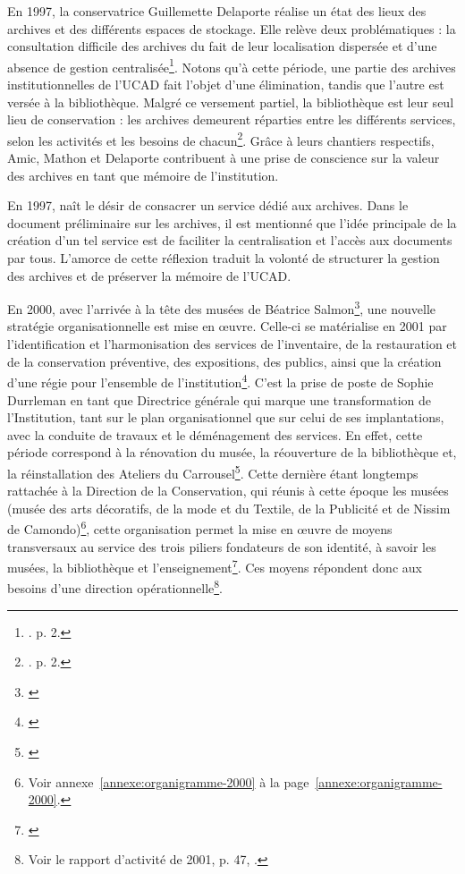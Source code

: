 En 1997, la conservatrice Guillemette Delaporte réalise un état des lieux des archives et des différents espaces de stockage. Elle relève deux problématiques : la  consultation difficile des archives du fait de leur localisation dispersée et d’une absence de gestion centralisée\footnote{\cite{delaporte-1997}. p. 2.}.  Notons qu'à cette période, une partie des archives institutionnelles de l’UCAD fait l’objet d’une élimination, tandis que l’autre est versée à la bibliothèque. Malgré ce versement partiel, la bibliothèque est leur seul lieu de conservation : les archives demeurent réparties entre les différents services, selon les activités et les besoins de chacun\footnote{\cite{delaporte-1997}. p. 2.}. Grâce à leurs chantiers respectifs, Amic, Mathon et Delaporte contribuent à une prise de conscience sur la valeur des archives en tant que mémoire de l'institution.

En 1997, naît le désir de consacrer un service dédié aux archives. Dans le document préliminaire sur les archives, il est mentionné que l’idée principale de la création d’un tel service est de faciliter la centralisation et l’accès aux documents par tous. L'amorce de cette réflexion traduit la volonté de structurer la gestion des archives et de préserver la mémoire de l’UCAD.


En 2000, avec l’arrivée à la tête des musées de Béatrice Salmon\footnote{\cite{mad-depuis-1864}}, une nouvelle stratégie organisationnelle est mise en œuvre. Celle-ci se matérialise en 2001 par l’identification et l'harmonisation des services de l’inventaire, de la restauration et de la conservation préventive, des expositions, des publics, ainsi que la création d’une régie pour l’ensemble de l’institution\footnote{\cite{dion-histoire-bad-2026}}. C'est la prise de poste de Sophie Durrleman en tant que Directrice générale qui marque une transformation de l’Institution, tant sur le plan organisationnel que sur celui de ses implantations, avec la conduite de travaux et le déménagement des services. En effet, cette période correspond à la rénovation du musée, la réouverture de la bibliothèque et, la réinstallation des Ateliers du Carrousel\footnote{\cite{mad-depuis-1864}}. Cette dernière étant longtemps rattachée à la Direction de la Conservation, qui réunis à cette époque les musées (musée des arts décoratifs, de la mode et du Textile, de la Publicité et de Nissim de Camondo)\footnote{Voir annexe~\ref{annexe:organigramme-2000} à la page~\ref{annexe:organigramme-2000}.}, cette organisation permet la mise en œuvre de moyens transversaux au service des trois piliers fondateurs de son identité, à savoir les musées, la bibliothèque et l’enseignement\footnote{\cite{dion-histoire-bad-2026}}. Ces moyens répondent donc aux besoins d’une direction opérationnelle\footnote{Voir le rapport d’activité de 2001, p. 47, \cite{JP801-rapports}.}.

